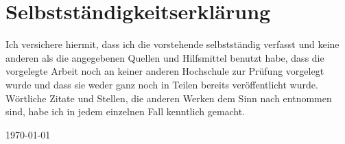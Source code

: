 
\section*{Selbstständigkeitserklärung}

Ich versichere hiermit, dass ich die vorstehende  selbstständig verfasst und keine anderen als die angegebenen Quellen und Hilfsmittel benutzt habe, dass die vorgelegte Arbeit noch an keiner anderen Hochschule zur Prüfung vorgelegt wurde und dass sie weder ganz noch in Teilen bereits veröffentlicht wurde. Wörtliche Zitate und Stellen, die anderen Werken dem Sinn nach entnommen sind, habe ich in jedem einzelnen Fall kenntlich gemacht.

\vspace{\baselineskip}

\noindent%
\datengerman\today%

\vspace{3\baselineskip}

\noindent \thesisauthor

\thispagestyle{empty}
